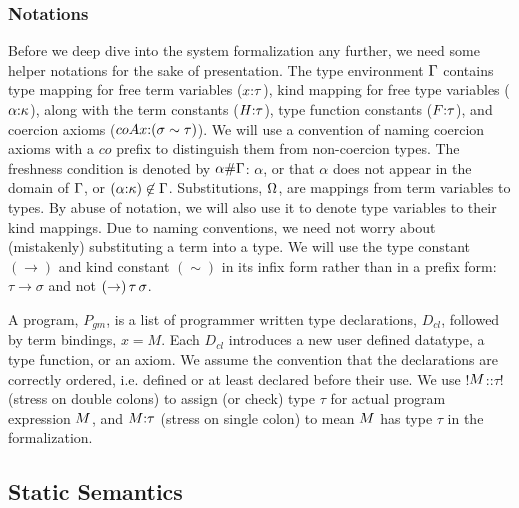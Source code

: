 \documentclass[screen,nonacm]{acmart}
\begin{document}
\subsubsection{Notations}\label{sec:notations}
Before we deep dive into the system formalization any further, we need some helper notations for the sake of presentation. The type environment $\Gamma$ contains type mapping for free term variables ($x{:}\tau$), kind mapping for free type variables ($\alpha{:}\kappa$), along with the term constants ($H{:}\tau$), type function constants ($F{:} \tau$), and coercion axioms ($coAx{:}(\sigma\sim\tau)$). We will use a convention of naming coercion axioms with a $co$ prefix to distinguish them from non-coercion types. The freshness condition is denoted by $\alpha \# \Gamma$: $\alpha$, or that $\alpha$ does not appear in the domain of $\Gamma$, or $(\alpha{:}\kappa) \not\in \Gamma$. Substitutions, $\Omega$, are mappings from term variables to types. By abuse of notation, we will also use it to denote type variables to their kind mappings. Due to naming conventions, we need not worry about (mistakenly) substituting a term into a type. We will use the type constant $(\to)$ and kind constant $(\sim)$ in its infix form rather than in a prefix form: $\tau \to \sigma$ and not $(\to)\,\tau\,\sigma$.

A program, $P_{gm}$, is a list of programmer written type declarations, $D_{cl}$, followed by term bindings, $x = M$. Each $D_{cl}$ introduces a new user defined datatype, a type function, or an axiom. We assume the convention that the declarations are correctly ordered, i.e. defined or at least declared before their use. We use !$M$::$\tau$! (stress on double colons) to assign (or check) type $\tau$ for actual program expression $M$, and $M {:} \tau$ (stress on single colon) to mean $M$ has type $\tau$ in the formalization.

\subsection{Static Semantics}\label{sec:sfc-static-sem}

\newcommand\KReflCo{
 \ib{\irule[\trule{co-refl}]
 {\TyKinding \TEnv \tau \kappa};
 {\CoKinding \TEnv {\refl \tau} {\tau \sim \tau}}
 }
}

\newcommand\KSymCo{
 \ib{\irule[\trule{co-sym}]
 {\CoKinding \TEnv \Co {\tau \sim \sigma}};
 {\CoKinding \TEnv {\Sym \Co} {\sigma \sim \tau}}
 }
}

\newcommand\KTransCo{
 \ib{\irule[\trule{co-trans}]
 {\CoKinding\TEnv {\Co_1} {\tau \sim \tau_2}}
 {\CoKinding\TEnv {\Co_2} {\tau_2 \sim \sigma}};
 {\CoKinding\TEnv {\trans {\Co_1} \Co_2} {\tau \sim \sigma}}
 }
}
\end{document}
